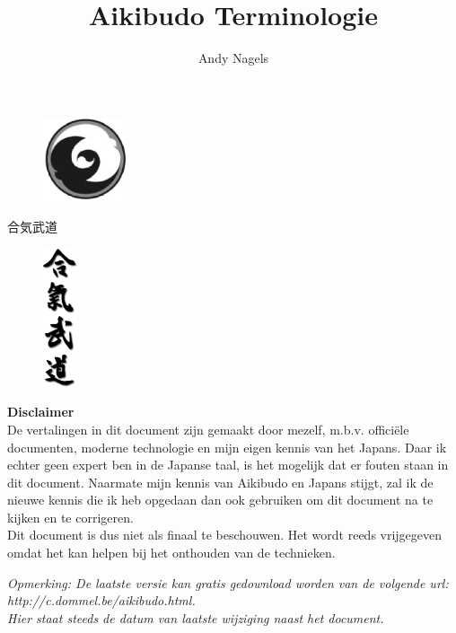 \documentclass[12pt]{scrartcl}
\begin{document}
\begin{CJK*}{UTF8}{min}
\CJKtilde

%
%
\title{Aikibudo Terminologie}
\author{Andy Nagels}
\maketitle
\thispagestyle{empty} %
\begin{figure}[H]
\centering
\includegraphics[width=2.5cm]{img/schild_aikibudo.eps}
\end{figure}

\begin{center}
合気武道
\end{center}

\begin{figure}[H]
\centering
\includegraphics[width=1.0cm]{img/aikibudo-kanji.eps}
\end{figure}

%
%
\newpage
\begin{center}
\textbf{Disclaimer}\\
De vertalingen in dit document zijn gemaakt door mezelf, m.b.v. offici\"{e}le documenten, moderne technologie en mijn eigen kennis van het Japans. Daar ik echter geen expert ben in de Japanse taal, is het mogelijk dat er fouten staan in dit document. Naarmate mijn kennis van Aikibudo en Japans stijgt, zal ik de nieuwe kennis die ik heb opgedaan dan ook gebruiken om dit document na te kijken en te corrigeren.\\
Dit document is dus niet als finaal te beschouwen. Het wordt reeds vrijgegeven omdat het kan helpen bij het onthouden van de technieken.
\end{center}
\begin{center}
\textit{{\em Opmerking:} De laatste versie kan gratis gedownload worden van de volgende url: http://c.dommel.be/aikibudo.html.\\
Hier staat steeds de datum van laatste wijziging naast het document.}
\end{center}


\end{CJK*}
\end{document}
